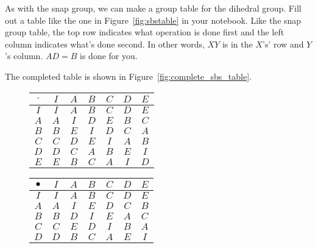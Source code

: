 \documentclass[../gatm_answers.tex]{subfiles}
\begin{document}
\begin{outer_problem}
\item As with the snap group, we can make a group table for the dihedral group. Fill out a table like the one in Figure~\ref{fig:sbstable} in your notebook. Like the snap group table, the top row indicates what operation is done first and the left column indicates what's done second. In other words, $XY$ is in the $X$'s' row and $Y$'s column. $AD=B$ is done for you.
\end{outer_problem}

\noindent The completed table is shown in Figure~\ref{fig:complete_sbs_table}.

\begin{figure}[h]
	\begin{center}
		\begin{minipage}[b]{0.45\textwidth}
			\centering
			\begin{tabular}{c|cccccc}
				\hline
				$\cdot$ & $I$ & $A$ & $B$ & $C$ & $D$ & $E$ \\ \hline
				\rowcolor{light-gray}
				$I$ & $I$ & $A$ & $B$ & $C$ & $D$ & $E$ \\
				$A$ & $A$ & $I$ & $D$ & $E$ & $B$ & $C$ \\
				\rowcolor{light-gray}
				$B$ & $B$ & $E$ & $I$ & $D$ & $C$ & $A$ \\
				$C$ & $C$ & $D$ & $E$ & $I$ & $A$ & $B$ \\
				\rowcolor{light-gray}
				$D$ & $D$ & $C$ & $A$ & $B$ & $E$ & $I$ \\
				$E$ & $E$ & $B$ & $C$ & $A$ & $I$ & $D$ \\ \hline
			\end{tabular}
			\vspace*{0.5\baselineskip}
		\end{minipage}
		\hfill
		\begin{minipage}[b]{0.45\textwidth}
			\centering
			\begin{tabular}{c|cccccc}
				\hline
				$\bullet$ & $I$ & $A$ & $B$ & $C$ & $D$ & $E$ \\ \hline
				\rowcolor{light-gray}
				$I$ & $I$ & $A$ & $B$ & $C$ & $D$ & $E$ \\
				$A$ & $A$ & $I$ & $E$ & $D$ & $C$ & $B$ \\
				\rowcolor{light-gray}
				$B$ & $B$ & $D$ & $I$ & $E$ & $A$ & $C$ \\
				$C$ & $C$ & $E$ & $D$ & $I$ & $B$ & $A$ \\
				\rowcolor{light-gray}
				$D$ & $D$ & $B$ & $C$ & $A$ & $E$ & $I$ \\

\end{tabular}
\end{minipage}
\end{center}
\end{figure}
\end{document}
